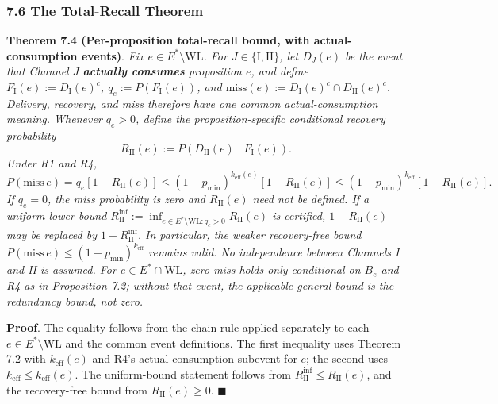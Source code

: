 \documentclass[
  11pt]{article}
\begin{document}
\subsubsection{7.6 The Total-Recall
Theorem}\label{the-total-recall-theorem}

\textbf{Theorem 7.4 (Per-proposition total-recall bound, with
actual-consumption events)}. \emph{Fix \(e\in E^*\setminus\mathrm{WL}\).
For \(J\in\{\mathrm I,\mathrm{II}\}\), let \(D_J(e)\) be the event that
Channel \(J\) \textbf{actually consumes} proposition \(e\), and define
\(F_{\mathrm I}(e):=D_{\mathrm I}(e)^c\), \(q_e:=P(F_{\mathrm I}(e))\),
and \(\mathrm{miss}(e):=D_{\mathrm I}(e)^c\cap D_{\mathrm{II}}(e)^c\).
Delivery, recovery, and miss therefore have one common
actual-consumption meaning. Whenever \(q_e>0\), define the
proposition-specific conditional recovery probability}
\[R_{\mathrm{II}}(e):=P(D_{\mathrm{II}}(e)\mid F_{\mathrm I}(e)).\]
\emph{Under R1 and R4,}
\[P(\mathrm{miss}\,e)=q_e[1-R_{\mathrm{II}}(e)]\le(1-p_{\min})^{k_{\mathrm{eff}}(e)}[1-R_{\mathrm{II}}(e)]\le(1-p_{\min})^{k_{\mathrm{eff}}}[1-R_{\mathrm{II}}(e)].\]
\emph{If \(q_e=0\), the miss probability is zero and
\(R_{\mathrm{II}}(e)\) need not be defined. If a uniform lower bound
\(R_{\mathrm{II}}^{\inf}:=\inf_{e\in E^*\setminus\mathrm{WL}:q_e>0}R_{\mathrm{II}}(e)\)
is certified, \(1-R_{\mathrm{II}}(e)\) may be replaced by
\(1-R_{\mathrm{II}}^{\inf}\). In particular, the weaker recovery-free
bound \(P(\mathrm{miss}\,e)\le(1-p_{\min})^{k_{\mathrm{eff}}}\) remains
valid. No independence between Channels I and II is assumed. For
\(e\in E^*\cap\mathrm{WL}\), zero miss holds only conditional on \(B_e\)
and R4 as in Proposition 7.2; without that event, the applicable general
bound is the redundancy bound, not zero.}

\textbf{Proof}. The equality follows from the chain rule applied
separately to each \(e\in E^*\setminus\mathrm{WL}\) and the common event
definitions. The first inequality uses Theorem 7.2 with
\(k_{\mathrm{eff}}(e)\) and R4's actual-consumption subevent for \(e\);
the second uses \(k_{\mathrm{eff}}\le k_{\mathrm{eff}}(e)\). The
uniform-bound statement follows from
\(R_{\mathrm{II}}^{\inf}\le R_{\mathrm{II}}(e)\), and the recovery-free
bound from \(R_{\mathrm{II}}(e)\ge0\). \(\blacksquare\)
\end{document}
